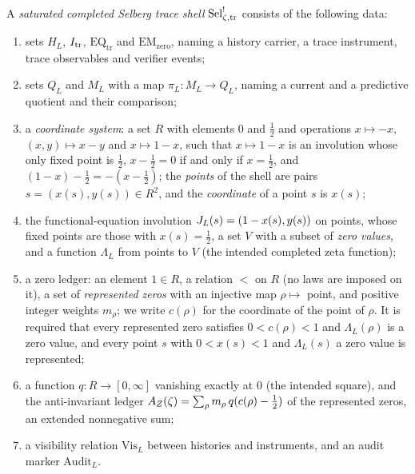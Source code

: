 \begin{definition}
\label{def:rh:sat-sel-shell}
A \emph{saturated completed Selberg trace shell} \(\mathrm{Sel}^{!}_{\zeta,\mathrm{tr}}\) consists of
the following data:
\begin{enumerate}[label=\textup{(\arabic*)}]
  \item sets \(H_L\), \(I_{\mathrm{tr}}\), \(\mathrm{EQ}_{\mathrm{tr}}\) and
        \(\mathrm{EM}_{\mathrm{zero}}\), naming a history carrier, a
        trace instrument, trace observables and verifier events;
  \item sets \(Q_L\) and \(M_L\) with a map \(\pi_L:M_L\to Q_L\),
        naming a current and a predictive quotient and their
        comparison;
  \item a \emph{coordinate system}: a set \(R\) with elements \(0\) and
        \(\frac12\) and operations \(x\mapsto-x\), \((x,y)\mapsto x-y\) and
        \(x\mapsto1-x\), such that \(x\mapsto1-x\) is an involution whose
        only fixed point is \(\frac12\), \(x-\frac12=0\) if and only if
        \(x=\frac12\), and \((1-x)-\frac12=-(x-\frac12)\); the
        \emph{points} of the shell are pairs \(s=(x(s),y(s))\in R^2\), and the \emph{coordinate} of a point \(s\) is \(x(s)\);
  \item the functional-equation involution
        \(J_{L}(s)=(1-x(s),y(s))\) on points,
        whose fixed points are those with \(x(s)=\frac12\),
        a set \(V\) with a subset of \emph{zero values}, and a function
        \(\Lambda_L\) from points to \(V\) (the intended completed zeta
        function);
  \item a zero ledger: an element \(1\in R\), a relation \(<\) on \(R\)
        (no laws are imposed on it), a set of \emph{represented zeros}
        with an injective map \(\rho\mapsto\) point, and positive integer
        weights \(m_\rho\); we write \(c(\rho)\) for the coordinate of the
        point of \(\rho\).  It is required that every represented zero satisfies
        \(0<c(\rho)<1\) and \(\Lambda_L(\rho)\) is a zero
        value, and every point \(s\) with \(0<x(s)<1\) and
        \(\Lambda_L(s)\) a zero value is represented;
  \item a function \(q:R\to[0,\infty]\) vanishing exactly at \(0\) (the
        intended square), and the anti-invariant ledger
        \(A_{Z}(\zeta)=\sum_\rho m_\rho\,q(c(\rho)-\frac12)\) of the
        represented zeros, an extended nonnegative sum;
  \item a visibility relation \(\mathrm{Vis}_L\) between histories and
        instruments, and an audit marker \(\mathrm{Audit}_L\).
\end{enumerate}
\end{definition}

